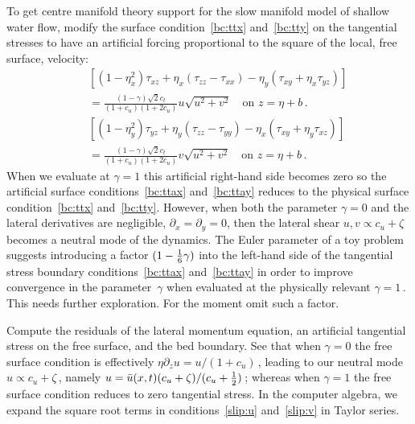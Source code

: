 \documentclass[12pt,a5paper]{article}
\newcommand{\zs}{\zeta}
\newcommand{\uu}{{\bar u}}
\begin{document}
To get centre manifold theory support for the slow manifold model of shallow water flow, modify the surface condition~\eqref{bc:ttx} and~\eqref{bc:tty} on the tangential stresses to have an artificial forcing proportional to the square of the local, free surface, velocity:
\begin{eqnarray}&&
    \left[
    (1-\eta_x^2)\tau_{xz}+\eta_x(\tau_{zz}-\tau_{xx})
    -\eta_y(\tau_{xy}+\eta_x\tau_{yz})
    \right] 
    \nonumber\\&&{}
    = \frac{(1-\gamma)\sqrt2c_t}{(1+c_u)(1+2c_u)} u\sqrt{u^2+v^2}
    \quad\text{on } z=\eta+b\,.
    \label{bc:ttax}
    \\&&
    \left[
    (1-\eta_y^2)\tau_{yz}+\eta_y(\tau_{zz}-\tau_{yy})
    -\eta_x(\tau_{xy}+\eta_y\tau_{xz})
    \right] 
    \nonumber\\&&{}
    = \frac{(1-\gamma)\sqrt2c_t}{(1+c_u)(1+2c_u)} v\sqrt{u^2+v^2}
    \quad\text{on } z=\eta+b\,.
    \label{bc:ttay}
\end{eqnarray}
When we evaluate at $\gamma=1$ this artificial right-hand side becomes zero so the artificial surface conditions~\eqref{bc:ttax} and~\eqref{bc:ttay} reduces to the physical surface condition~\eqref{bc:ttx} and~\eqref{bc:tty}.  However, when both the parameter $\gamma=0$ and the lateral derivatives are negligible, $\partial_x=\partial_y=0$, then the lateral shear $u,v\propto c_u+\zs$ becomes a neutral mode of the dynamics. The Euler parameter of a toy problem suggests introducing a factor $(1-{\textstyle\frac{1}{6}}\gamma)$ into the left-hand side of the tangential stress boundary conditions~\eqref{bc:ttax} and~\eqref{bc:ttay} in order to improve convergence in the parameter~$\gamma$ when evaluated at the physically relevant $\gamma=1$\,.  This needs further exploration.  For the moment omit such a factor.

Compute the residuals of the lateral momentum equation, an artificial tangential stress on the free surface, and the bed boundary.  See that when $\gamma=0$ the free surface condition is effectively $\eta \partial_z u=u/(1+c_u)$\,, leading to our neutral mode $u\propto c_u+\zs$\,, namely $u=\uu(x,t)(c_u+\zs)/(c_u+\rat12)$\,; whereas when $\gamma=1$ the free surface condition reduces to zero tangential stress. In the computer algebra, we expand the square root terms in conditions~\eqref{slip:u} and~\eqref{slip:v} in Taylor series.
\end{document}

